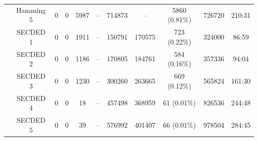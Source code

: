 \begin{frame}
\begin{table}[H]
\begin{tabular}{@{}ccccccccccc@{}}
                                                               & Hamming 5     & 0     & 0            & 5987  & --          & \num{714873}                             & --                                      & 5860 {\tiny (0.81\%)} & \num{726720} & 210:31                                  \\
                                                               & SECDED 1      & 0     & 0            & 1911  & --          & \num{150791}                             & \num{170575}                            & 723 {\tiny (0.22\%)}  & \num{324000} & 86:59                                   \\
                                                               & SECDED 2      & 0     & 0            & 1186  & --          & \num{170805}                             & \num{184761}                            & 584 {\tiny (0.16\%)}  & \num{357336} & 94:04                                   \\
                                                               & SECDED 3      & 0     & 0            & 1230  & --          & \num{300260}                             & \num{263665}                            & 669 {\tiny (0.12\%)}  & \num{565824} & 161:30                                  \\
                                                               & SECDED 4      & 0     & 0            & 18    & --          & \num{457498}                             & \num{368959}                            & 61 {\tiny (0.01\%)}   & \num{826536} & 244:48                                  \\
                                                               & SECDED 5      & 0     & 0            & 39    & --          & \num{576992}                             & \num{401407}                            & 66 {\tiny (0.01\%)}   & \num{978504} & 284:45                                  \\
            \bottomrule
        \end{tabular}
    \end{table}
\end{frame}
